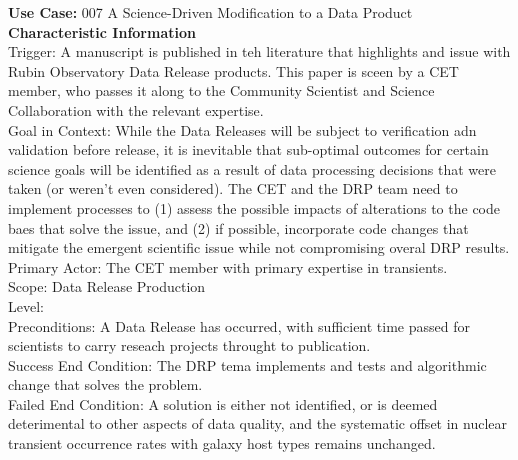 {\bf Use Case:} 007 A Science-Driven Modification to a Data Product \\

{\bf Characteristic Information} \\
Trigger: A manuscript is published in teh literature that highlights and issue with Rubin Observatory Data Release products. This paper is sceen by a CET member, who passes it along to the Community Scientist and Science Collaboration with the relevant expertise. \\
Goal in Context: While the Data Releases will be subject to verification adn validation before release, it is inevitable that sub-optimal outcomes for certain science goals will be identified as a result of data processing decisions that were taken (or weren't even considered).  The CET and the DRP team need to implement processes to (1) assess the possible impacts of alterations to the code baes that solve the issue, and (2) if possible, incorporate code changes that mitigate the emergent scientific issue while not compromising overal DRP results. \\
Primary Actor: The CET member with primary expertise in transients. \\
Scope: Data Release Production \\
Level: \\
Preconditions: A Data Release has occurred, with sufficient time passed for scientists to carry reseach projects throught to publication. \\
Success End Condition: The DRP tema implements and tests and algorithmic change that solves the problem. \\
Failed End Condition: A solution is either not identified, or is deemed deterimental to other aspects of data quality, and the systematic offset in nuclear transient occurrence rates with galaxy host types remains unchanged. \\

